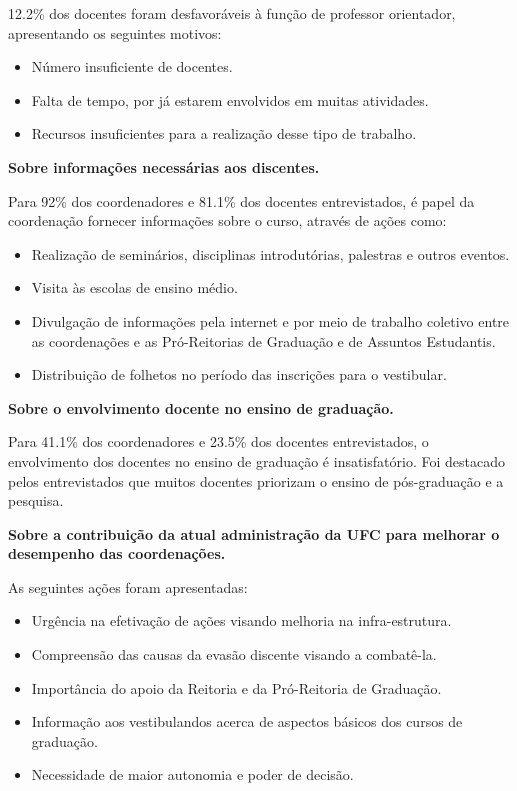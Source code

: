 \documentclass{report}
\begin{document}
12.2\% dos docentes foram desfavoráveis à função de professor orientador, apresentando os seguintes motivos:

\begin{itemize}
\item Número insuficiente de docentes.
\item Falta de tempo, por já estarem envolvidos em muitas atividades.
\item Recursos insuficientes para a realização desse tipo de trabalho.
\end{itemize}

\textbf{Sobre informações necessárias aos discentes.}

Para 92\% dos coordenadores e 81.1\% dos docentes entrevistados, é papel da coordenação fornecer informações sobre o curso, através de ações como:

\begin{itemize}
\item Realização de seminários, disciplinas introdutórias, palestras e outros eventos.
\item Visita às escolas de ensino médio.
\item Divulgação de informações pela internet e por meio de trabalho coletivo entre as coordenações e as Pró-Reitorias de Graduação e de Assuntos Estudantis.
\item Distribuição de folhetos no período das inscrições para o vestibular.
\end{itemize}

\textbf{Sobre o envolvimento docente no ensino de graduação.}

Para 41.1\% dos coordenadores e 23.5\% dos docentes entrevistados, o envolvimento dos docentes no ensino de graduação é insatisfatório. Foi destacado pelos entrevistados que muitos docentes priorizam o ensino de pós-graduação e a pesquisa.

\textbf{Sobre a contribuição da atual administração da UFC para melhorar o desempenho das coordenações.}

As seguintes ações foram apresentadas:

\begin{itemize}
\item Urgência na efetivação de ações visando melhoria na infra-estrutura.
\item Compreensão das causas da evasão discente visando a combatê-la.
\item Importância do apoio da Reitoria e da Pró-Reitoria de Graduação.
\item Informação aos vestibulandos acerca de aspectos básicos dos cursos de graduação.
\item Necessidade de maior autonomia e poder de decisão.
\end{itemize}
\end{document}
